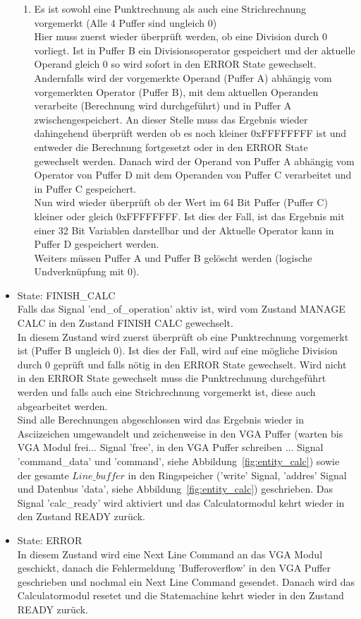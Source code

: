 \begin{itemize}
\begin{enumerate}
\item Es ist sowohl eine Punktrechnung als auch eine Strichrechnung vorgemerkt (Alle 4 Puffer sind ungleich 0) \\
Hier muss zuerst wieder überprüft werden, ob eine Division durch 0 vorliegt. Ist in Puffer B ein Divisionsoperator gespeichert und der aktuelle Operand gleich 0 so wird sofort in den ERROR State gewechselt. Andernfalls wird der vorgemerkte Operand (Puffer A) abhängig vom vorgemerkten Operator (Puffer B), mit dem aktuellen Operanden verarbeite (Berechnung wird durchgeführt) und in Puffer A zwischengespeichert. An dieser Stelle muss das Ergebnis wieder dahingehend überprüft werden ob es noch kleiner 0xFFFFFFFF ist und entweder die Berechnung fortgesetzt oder in den ERROR State gewechselt werden. Danach wird der Operand von Puffer A abhängig vom Operator von Puffer D mit dem Operanden von Puffer C verarbeitet und in Puffer C gespeichert.\\ 
Nun wird wieder überprüft ob der Wert im 64 Bit Puffer (Puffer C) kleiner oder gleich 0xFFFFFFFF. Ist dies der Fall, ist das Ergebnis mit einer 32 Bit Variablen darstellbar und der Aktuelle Operator kann in Puffer D gespeichert werden. \\
Weiters müssen Puffer A und Puffer B gelöscht werden (logische Undverknüpfung mit 0).

\end{enumerate}

\item State: FINISH\_CALC \\
Falls das Signal 'end\_of\_operation' aktiv ist, wird vom Zustand MANAGE CALC in den Zustand FINISH CALC gewechselt. \\
In diesem Zustand wird zuerst überprüft ob eine Punktrechnung vorgemerkt ist (Puffer B ungleich 0). Ist dies der Fall, wird auf eine mögliche Division durch 0 geprüft und falls nötig in den ERROR State gewechselt. Wird nicht in den ERROR State gewechselt muss die Punktrechnung durchgeführt werden und falls auch eine Strichrechnung vorgemerkt ist, diese auch abgearbeitet werden. \\
Sind alle Berechnungen abgeschlossen wird das Ergebnis wieder in Asciizeichen umgewandelt und zeichenweise in den VGA Puffer (warten bis VGA Modul frei... Signal 'free', in den VGA Puffer schreiben ... Signal 'command\_data' und 'command', siehe Abbildung~\ref{fig:entity_calc}) sowie der gesamte $Line\_buffer$ in den Ringspeicher ('write' Signal, 'addres' Signal und Datenbus 'data', siehe Abbildung~\ref{fig:entity_calc}) geschrieben. 
Das Signal 'calc\_ready' wird aktiviert und das Calculatormodul kehrt wieder in den Zustand READY zurück. 

\item State: ERROR \\
In diesem Zustand wird eine Next Line Command an das VGA Modul geschickt, danach die Fehlermeldung 'Bufferoverflow' in den VGA Puffer geschrieben und nochmal ein Next Line Command gesendet.
Danach wird das Calculatormodul resetet und die Statemachine kehrt wieder in den Zustand READY zurück.

\end{itemize}

